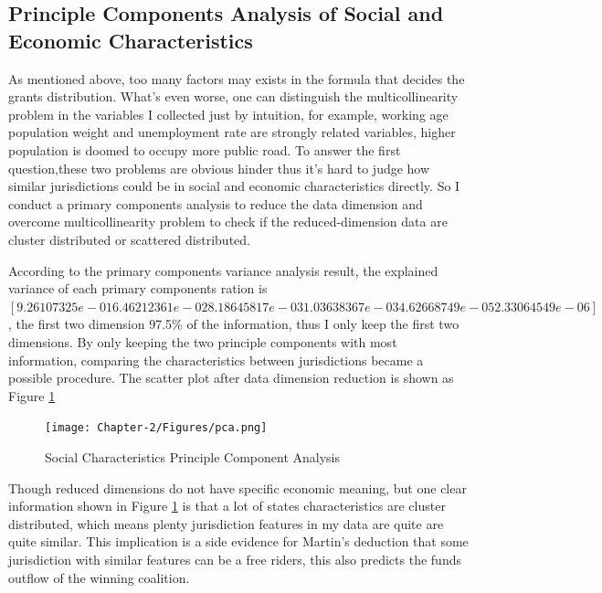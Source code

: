 \subsection{Principle Components Analysis of Social and Economic Characteristics}
As mentioned above, too many factors may exists in the formula that decides the grants distribution. What's even worse, one can distinguish the multicollinearity problem in the variables I collected just by intuition, for example, working age population weight and unemployment rate are strongly related variables, higher population is doomed to occupy more public road. To answer the first question,these two problems are obvious hinder thus it's hard to judge how similar jurisdictions could be in social and economic characteristics directly. So I conduct a primary components analysis to reduce the data dimension and overcome multicollinearity problem to check if the reduced-dimension data are cluster distributed or scattered distributed.

According to the primary components variance analysis result, the explained variance of each primary components ration is $ [9.26107325e-01 6.46212361e-02 8.18645817e-03 1.03638367e-03
            4.62668749e-05 2.33064549e-06]$, the first two dimension 97.5\% of the information, thus I only keep the first two dimensions. By only keeping the two principle components with most information, comparing the characteristics between jurisdictions became a possible procedure. The scatter plot after data dimension reduction is shown as Figure \ref*{Figure 2.2}

\begin{figure}[H]
    \centering
    \texttt{[image: Chapter-2/Figures/pca.png]}
    \caption[Social Characteristics Principle components Analysis]{Social Characteristics Principle Component Analysis
        \texttt{} }
    \label{Figure 2.2}
\end{figure}

Though reduced dimensions do not have specific economic meaning, but one clear information shown in Figure \ref*{Figure 2.2} is that a lot of states characteristics are cluster distributed, which means plenty jurisdiction features in my data are quite are quite similar. This implication is a side evidence for Martin's \cite{martin2018dividing} deduction that some jurisdiction with similar features can be a free riders, this also predicts the funds outflow of the winning coalition.


